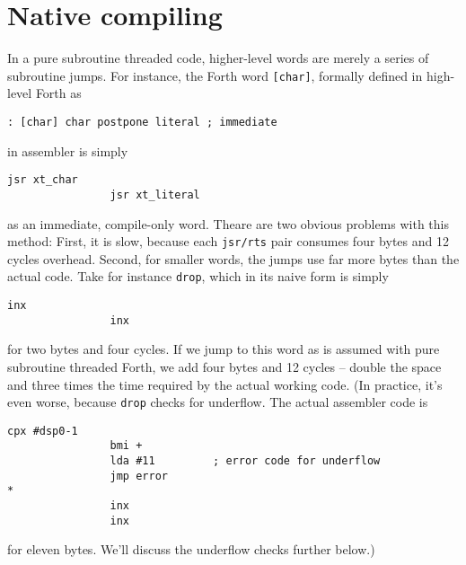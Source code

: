 
\section{Native compiling}

In a pure subroutine threaded code, higher-level words are merely a series of
subroutine jumps. For instance, the Forth word
\texttt{[char]}, formally defined in high-level
Forth as

\begin{lstlisting}[frame=lines]
        : [char] char postpone literal ; immediate
\end{lstlisting}

\noindent in assembler is simply

\begin{lstlisting}[frame=lines]
                jsr xt_char
                jsr xt_literal
\end{lstlisting}

\noindent as an immediate, compile-only word. Theare are two obvious problems
with this method: First, it is slow, because each \texttt{jsr/rts} pair consumes
four bytes and 12 cycles overhead. Second, for smaller words, the jumps use far
more bytes than the actual code. Take for instance
\texttt{drop}, which in its naive form is simply

\begin{lstlisting}[frame=lines]
                inx
                inx
\end{lstlisting}

\noindent for two bytes and four cycles. If we jump to this word as is assumed
with pure subroutine threaded Forth, we add four bytes and 12 cycles -- double
the space and three times the time required by the actual working code. (In
practice, it's even worse, because \texttt{drop} checks for
underflow. The actual assembler code is

\begin{lstlisting}[frame=lines]
                cpx #dsp0-1
                bmi +
                lda #11         ; error code for underflow
                jmp error
*
                inx
                inx
\end{lstlisting}

\noindent for eleven bytes. We'll discuss the underflow checks further below.)

